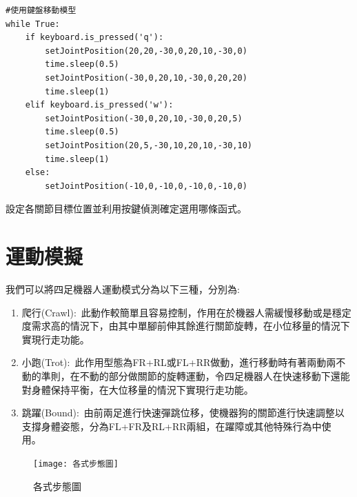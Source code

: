 \label{鍵盤控制及角度設定}
\begin{lstlisting}[caption=\Large 鍵盤控制及角度設定]
#使用鍵盤移動模型
while True:
    if keyboard.is_pressed('q'):
        setJointPosition(20,20,-30,0,20,10,-30,0)
        time.sleep(0.5)
        setJointPosition(-30,0,20,10,-30,0,20,20)
        time.sleep(1)
    elif keyboard.is_pressed('w'):
        setJointPosition(-30,0,20,10,-30,0,20,5)
        time.sleep(0.5)
        setJointPosition(20,5,-30,10,20,10,-30,10)
        time.sleep(1)
    else:
        setJointPosition(-10,0,-10,0,-10,0,-10,0)
\end{lstlisting}
設定各關節目標位置並利用按鍵偵測確定選用哪條函式。\\

\section{運動模擬}
我們可以將四足機器人運動模式分為以下三種，分別為:\\

\begin{enumerate}
\item 爬行(Crawl):\
此動作較簡單且容易控制，作用在於機器人需緩慢移動或是穩定度需求高的情況下，由其中單腳前伸其餘進行關節旋轉，在小位移量的情況下實現行走功能。\
\item 小跑(Trot):\
此作用型態為FR+RL或FL+RR做動，進行移動時有著兩動兩不動的準則，在不動的部分做關節的旋轉運動，令四足機器人在快速移動下還能對身體保持平衡，在大位移量的情況下實現行走功能。\
\item 跳躍(Bound):\
由前兩足進行快速彈跳位移，使機器狗的關節進行快速調整以支撐身體姿態，分為FL+FR及RL+RR兩組，在躍障或其他特殊行為中使用。\
\end{enumerate}
\begin{figure}[hbt!]
\center
\texttt{[image: 各式步態圖]}
\caption{各式步態圖}\label{各式步態圖}
\end{figure}
\newpage


